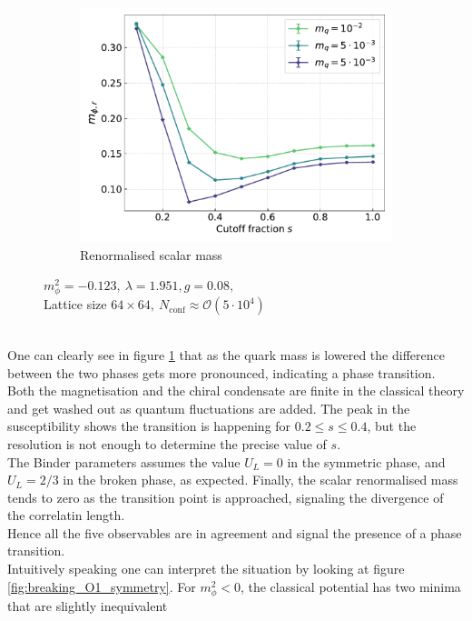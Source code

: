 \begin{figure}[h!]
\begin{subfigure}{0.47\textwidth}
    \includegraphics[width=\textwidth]{figures/chiral_PT/mphir.pdf}
    \caption{Renormalised scalar mass}
\end{subfigure}
\caption{$m_\phi^2=-0.123, \ \lambda=1.951, g=0.08,$ \\ Lattice size $64 \times 64, \ N_\text{conf} \approx \mathcal{O}(5 \cdot 10^4)$}
\label{fig:chiral:symmetry_breaking}
\end{figure}\\
One can clearly see in figure \ref{fig:chiral:symmetry_breaking} that as the quark  mass is lowered the difference between the two phases gets more pronounced, indicating a phase transition. \\
Both the magnetisation and the chiral condensate are finite in the classical theory and get washed out as quantum fluctuations are added. 
The peak in the susceptibility shows the transition is happening for $0.2 \leq s \leq 0.4$, but the resolution is not enough to determine the precise value of $s$. \\ 
The Binder parameters assumes the value $U_L = 0$ in the symmetric phase, and $U_L=2/3$ in the broken phase, as expected. Finally, the scalar renormalised mass tends to zero as the transition point is approached, signaling the divergence of the correlatin length. \\
Hence all the five observables are in agreement and signal the presence of a phase transition. \\
Intuitively speaking one can interpret the situation by looking at figure \ref{fig:breaking_O1_symmetry}. For $m_\phi^2 < 0$, the classical potential has two minima that are slightly inequivalent 
